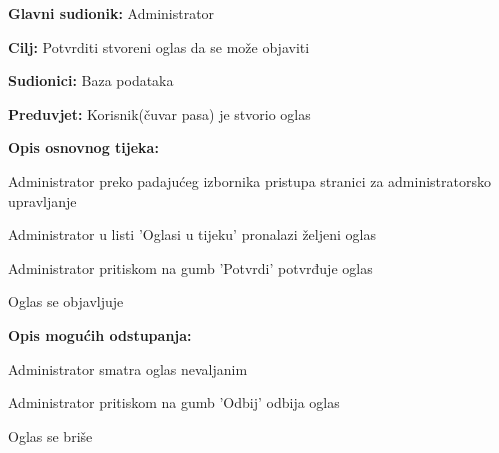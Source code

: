 					\noindent {}
					\begin{packed_item}
						
						\item \textbf{Glavni sudionik: } Administrator
						\item  \textbf{Cilj:} Potvrditi stvoreni oglas da se može objaviti
						\item  \textbf{Sudionici:} Baza podataka
						\item  \textbf{Preduvjet:} Korisnik(čuvar pasa) je stvorio oglas
						\item  \textbf{Opis osnovnog tijeka:}
						
						\item[] \begin{packed_enum}
							
							\item Administrator preko padajućeg izbornika pristupa stranici za administratorsko upravljanje
							\item Administrator u listi 'Oglasi u tijeku' pronalazi željeni oglas
							\item Administrator pritiskom na gumb 'Potvrdi' potvrđuje oglas
							\item Oglas se objavljuje
							
						\end{packed_enum}
						\item  \textbf{Opis mogućih odstupanja:}
						
						\item[] \begin{packed_item}
							
							\item[3.a] Administrator smatra oglas nevaljanim
							\item[] \begin{packed_enum}
								
								\item Administrator pritiskom na gumb 'Odbij' odbija oglas
								\item Oglas se briše 
								
							\end{packed_enum}
							
						\end{packed_item}
					\end{packed_item}
					
